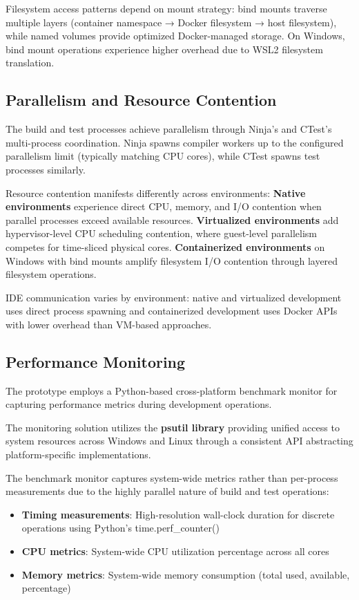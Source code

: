 Filesystem access patterns depend on mount strategy: bind mounts traverse multiple layers (container namespace → Docker filesystem → host filesystem), while named volumes provide optimized Docker-managed storage.
On Windows, bind mount operations experience higher overhead due to WSL2 filesystem translation.

\subsection{Parallelism and Resource Contention}

The build and test processes achieve parallelism through Ninja's and CTest's multi-process coordination.
Ninja spawns compiler workers up to the configured parallelism limit (typically matching CPU cores), while CTest spawns test processes similarly.

Resource contention manifests differently across environments:
\textbf{Native environments} experience direct CPU, memory, and I/O contention when parallel processes exceed available resources.
\textbf{Virtualized environments} add hypervisor-level CPU scheduling contention, where guest-level parallelism competes for time-sliced physical cores.
\textbf{Containerized environments} on Windows with bind mounts amplify filesystem I/O contention through layered filesystem operations.

IDE communication varies by environment: native and virtualized development uses direct process spawning and containerized development uses Docker APIs with lower overhead than VM-based approaches.

\subsection{Performance Monitoring}

The prototype employs a Python-based cross-platform benchmark monitor for capturing performance metrics during development operations.

The monitoring solution utilizes the \textbf{psutil library} providing unified access to system resources across Windows and Linux through a consistent API abstracting platform-specific implementations.

The benchmark monitor captures system-wide metrics rather than per-process measurements due to the highly parallel nature of build and test operations:
\begin{itemize}
\item \textbf{Timing measurements}: High-resolution wall-clock duration for discrete operations using Python's time.perf\_counter()
\item \textbf{CPU metrics}: System-wide CPU utilization percentage across all cores
\item \textbf{Memory metrics}: System-wide memory consumption (total used, available, percentage)
\end{itemize}

